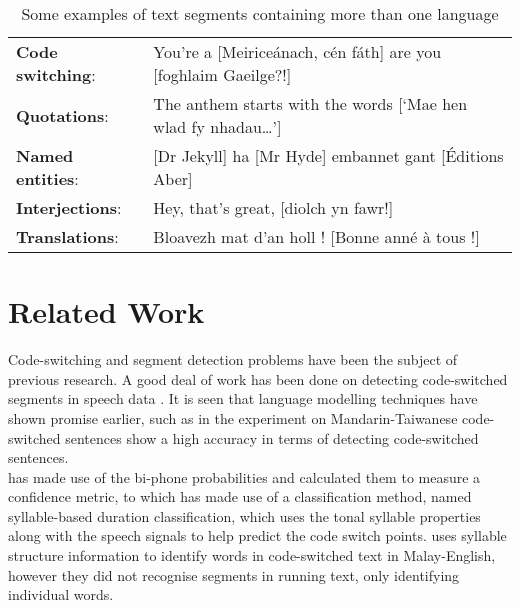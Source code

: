 \documentclass[11pt]{article}
\begin{document}
\begin{table}[h]
\begin{center}
\begin{tabular}{ll}
 \textbf{Code switching}: & You're a [Meirice\'{a}nach, c\'{e}n f\'{a}th] are you [foghlaim Gaeilge?!] \\
\textbf{Quotations}: & The anthem starts with the words [`Mae hen wlad fy nhadau\ldots'] \\
 \textbf{Named entities}: & [Dr Jekyll] ha [Mr Hyde] embannet gant [\'{E}ditions Aber] \\
 \textbf{Interjections}: & Hey, that's great, [diolch yn fawr!] \\
 \textbf{Translations}: & Bloavezh mat d'an holl ! [Bonne ann\'{e} \`{a} tous !] \\
\end{tabular}
\caption{Some examples of text segments containing more than one language}
\label{table:examples}
\end{center}
\end{table}


\section{Related Work}
\label{sec:relwork}

Code-switching and segment detection problems have been the subject of previous research. A good deal of work
has been done on detecting code-switched segments in speech data \cite{chan2004detection,lyu2006language}.
It is seen that language modelling techniques have shown promise earlier, such as in \cite{yu2013identification} 
the experiment on Mandarin-Taiwanese code-switched sentences show a high accuracy in terms of detecting code-switched sentences. \\

 has made use of the bi-phone probabilities and calculated them to measure a confidence metric, 
to \cite{lyu2006language} which has made use of a classification method, named syllable-based duration classification, 
which uses the tonal syllable properties along with the speech signals to help predict the code switch points.  
uses syllable structure information to identify words in code-switched text in Malay-English, however they did not 
recognise segments in running text, only identifying individual words.

\end{document}
